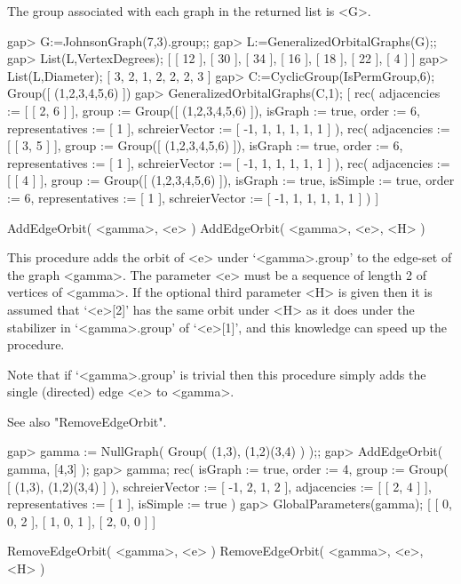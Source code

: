 The group associated with each graph in the returned list is <G>. 

\beginexample
gap> G:=JohnsonGraph(7,3).group;;
gap> L:=GeneralizedOrbitalGraphs(G);;
gap> List(L,VertexDegrees);
[ [ 12 ], [ 30 ], [ 34 ], [ 16 ], [ 18 ], [ 22 ], [ 4 ] ]
gap> List(L,Diameter);
[ 3, 2, 1, 2, 2, 2, 3 ]
gap> C:=CyclicGroup(IsPermGroup,6);
Group([ (1,2,3,4,5,6) ])
gap> GeneralizedOrbitalGraphs(C,1);
[ rec( adjacencies := [ [ 2, 6 ] ], group := Group([ (1,2,3,4,5,6) ]), 
      isGraph := true, order := 6, representatives := [ 1 ], 
      schreierVector := [ -1, 1, 1, 1, 1, 1 ] ), 
  rec( adjacencies := [ [ 3, 5 ] ], group := Group([ (1,2,3,4,5,6) ]), 
      isGraph := true, order := 6, representatives := [ 1 ], 
      schreierVector := [ -1, 1, 1, 1, 1, 1 ] ), 
  rec( adjacencies := [ [ 4 ] ], group := Group([ (1,2,3,4,5,6) ]), 
      isGraph := true, isSimple := true, order := 6, representatives := [ 1 ],
      schreierVector := [ -1, 1, 1, 1, 1, 1 ] ) ]
\endexample


\>AddEdgeOrbit( <gamma>, <e> )
\>AddEdgeOrbit( <gamma>, <e>, <H> )

This procedure adds the orbit of <e> under `<gamma>.group' to the
edge-set of the graph <gamma>. The parameter <e> must be a sequence of
length 2 of vertices of <gamma>. If the optional third parameter <H> is
given then it is assumed that `<e>[2]' has the same orbit under <H> as
it does under the stabilizer in `<gamma>.group' of `<e>[1]', and this
knowledge can speed up the procedure.

Note that if `<gamma>.group' is trivial then this procedure simply adds the
single (directed) edge <e> to <gamma>.

See also "RemoveEdgeOrbit".

\beginexample
gap> gamma := NullGraph( Group( (1,3), (1,2)(3,4) ) );;
gap> AddEdgeOrbit( gamma, [4,3] );
gap> gamma;
rec(
  isGraph := true,
  order := 4,
  group := Group( [ (1,3), (1,2)(3,4) ] ),
  schreierVector := [ -1, 2, 1, 2 ],
  adjacencies := [ [ 2, 4 ] ],
  representatives := [ 1 ],
  isSimple := true )
gap> GlobalParameters(gamma);
[ [ 0, 0, 2 ], [ 1, 0, 1 ], [ 2, 0, 0 ] ]
\endexample


\>RemoveEdgeOrbit( <gamma>, <e> )
\>RemoveEdgeOrbit( <gamma>, <e>, <H> )

